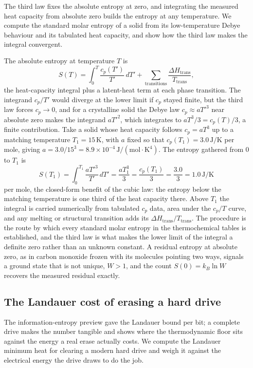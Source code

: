 The third law fixes the absolute entropy at zero, and integrating the measured
heat capacity from absolute zero builds the entropy at any temperature. We compute
the standard molar entropy of a solid from its low-temperature Debye behaviour and
its tabulated heat capacity, and show how the third law makes the integral
convergent.

The absolute entropy at temperature $T$ is
\[
S(T) = \int_0^T \frac{c_p(T')}{T'}\,dT'
+ \sum_{\text{transitions}} \frac{\Delta H_{\text{trans}}}{T_{\text{trans}}},
\]
the heat-capacity integral plus a latent-heat term at each phase transition. The
integrand $c_p/T'$ would diverge at the lower limit if $c_p$ stayed finite, but
the third law forces $c_p \to 0$, and for a crystalline solid the Debye law
$c_p \approx a T'^3$ near absolute zero makes the integrand $a T'^2$, which
integrates to $a T^3/3 = c_p(T)/3$, a finite contribution. Take a solid whose
heat capacity follows $c_p = a T^3$ up to a matching temperature $T_1 =
15\,\si{\kelvin}$, with $a$ fixed so that $c_p(T_1) = 3.0\,\si{\joule\per\kelvin}$
per mole, giving $a = 3.0/15^3 = 8.9\times10^{-4}\,\text{J}/(\text{mol}\cdot
\text{K}^4)$. The entropy gathered from $0$ to $T_1$ is
\[
S(T_1) = \int_0^{T_1} \frac{a T'^3}{T'}\,dT' = \frac{a T_1^3}{3}
= \frac{c_p(T_1)}{3} = \frac{3.0}{3} = 1.0\,\si{\joule\per\kelvin}
\]
per mole, the closed-form benefit of the cubic law: the entropy below the matching
temperature is one third of the heat capacity there. Above $T_1$ the integral is
carried numerically from tabulated $c_p$ data, area under the $c_p/T$ curve, and
any melting or structural transition adds its $\Delta H_{\text{trans}}/
T_{\text{trans}}$. The procedure is the route by which every standard molar
entropy in the thermochemical tables is established, and the third law is what
makes the lower limit of the integral a definite zero rather than an unknown
constant. A residual entropy at absolute zero, as in carbon monoxide frozen with
its molecules pointing two ways, signals a ground state that is not unique, $W >
1$, and the count $S(0) = k_B \ln W$ recovers the measured residual exactly.

\subsection{The Landauer cost of erasing a hard drive}

The information-entropy preview gave the Landauer bound per bit; a complete drive
makes the number tangible and shows where the thermodynamic floor sits against the
energy a real erase actually costs. We compute the Landauer minimum heat for
clearing a modern hard drive and weigh it against the electrical energy the drive
draws to do the job.

